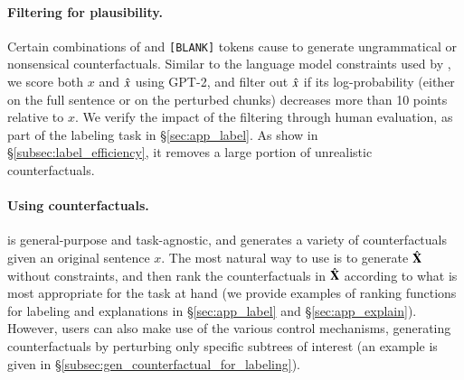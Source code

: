 \paragraph{Filtering for plausibility.}
Certain combinations of \tagstrs and \texttt{[BLANK]} tokens cause \sysname to generate ungrammatical or nonsensical counterfactuals. 
Similar to the language model constraints used by \citet{morris2020textattack}, we score both $x$ and $\hat{x}$ using GPT-2, and filter out $\hat{x}$ if its log-probability (either on the full sentence or on the perturbed chunks) decreases more than 10 points relative to $x$.
We verify the impact of the filtering through human evaluation, as part of the labeling task in \S\ref{sec:app_label}.
As show in \S\ref{subsec:label_efficiency}, it removes a large portion of unrealistic counterfactuals.



\paragraph{Using counterfactuals.}
\sysname is general-purpose and task-agnostic, and generates a variety of counterfactuals given an original sentence $x$. The most natural way to use \sysname is to generate $\hat{\mathbf{X}}$ without constraints, and then rank the counterfactuals in  $\hat{\mathbf{X}}$ according to what is most appropriate for the task at hand (we provide examples of ranking functions for labeling and explanations in  \S\ref{sec:app_label} and \S\ref{sec:app_explain}). However, users can also make use of the various control mechanisms, \eg generating counterfactuals by perturbing only specific subtrees of interest (an example is given in \S\ref{subsec:gen_counterfactual_for_labeling}).






